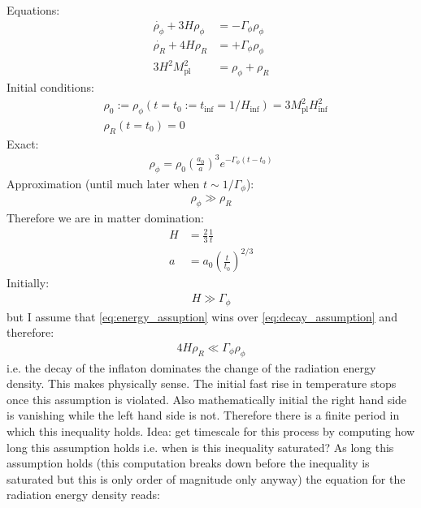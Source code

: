 \documentclass[13pt,a4paper]{article}
\begin{document}

\newcommand{\jana}[1]{{\color{magenta}{#1}}}
\noindent
Equations:
\begin{align}
    \dot{\rho_\phi} + 3 H \rho_\phi &= - \Gamma_\phi \rho_\phi \\
    \dot{\rho_R} + 4 H \rho_R &= + \Gamma_\phi \rho_\phi \\
    3 H^2 M_{\mathrm{pl}}^2 &= \rho_\phi + \rho_R
\end{align}
Initial conditions:
\begin{align}
    \label{eq:initial}
    &\rho_0 := \rho_\phi(t = t_0 := t_\mathrm{inf} = 1 / H_\mathrm{inf}) = 3 M_{\mathrm{pl}}^2 H_{\mathrm{inf}}^2 \\
    &\rho_R(t = t_0) = 0
\end{align}
Exact:
\begin{align}
    \label{eq:inflaton_solution}
    \rho_\phi = \rho_0 \left( \frac{a_0}{a} \right)^3 e^{- \Gamma_\phi (t - t_0)}
\end{align}
Approximation (until much later when $t \sim 1 / \Gamma_\phi$):
\begin{align}
    \label{eq:energy_assuption}
    \rho_\phi \gg \rho_R
\end{align}
Therefore we are in matter domination:
\begin{align}
    H &= \frac{2}{3} \frac{1}{t} \\
    a &= a_0 \left(\frac{t} {t_0}\right)^{2 / 3}
\end{align}
Initially:
\begin{align}
    \label{eq:decay_assumption}
    H \gg \Gamma_\phi
\end{align}
but I assume that \eqref{eq:energy_assuption} wins over \eqref{eq:decay_assumption} and therefore:
\begin{align}
    \label{eq:condition}
    4 H \rho_R \ll \Gamma_\phi \rho_\phi
\end{align}
i.e. the decay of the inflaton dominates the change of the radiation energy density.
This makes physically sense.
The initial fast rise in temperature stops once this assumption is violated. Also mathematically initial the right hand side is vanishing while the left hand side is not. Therefore there is a finite period in which this inequality holds.
Idea: get timescale for this process by computing how long this assumption holds i.e. when is this inequality saturated?
As long this assumption holds (this computation breaks down before the inequality is saturated but this is only order of magnitude only anyway) the equation for the radiation energy density reads:
\end{document}
